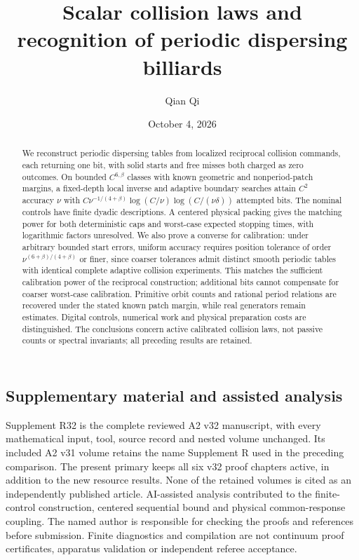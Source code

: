 \documentclass[11pt]{amsart}
\title[Scalar collision laws]{Scalar collision laws and recognition of periodic dispersing billiards}
\author{Qian Qi}
\date{October 4, 2026}
\theoremstyle{definition}\newtheorem{definition}[theorem]{Definition}
\theoremstyle{remark}\newtheorem{remark}[theorem]{Remark}
\numberwithin{equation}{section}
\begin{document}
\begin{abstract}
We reconstruct periodic dispersing tables from localized reciprocal
collision commands, each returning one bit, with solid starts and free
misses both charged as zero outcomes. On bounded $C^{6,\beta}$ classes
with known geometric and nonperiod-patch margins, a fixed-depth local
inverse and adaptive boundary searches attain $C^2$ accuracy $\nu$ with
$C\nu^{-1/(4+\beta)}\log(C/\nu)\log(C/(\nu\delta))$ attempted bits.
The nominal controls have finite dyadic descriptions. A centered physical
packing gives the matching power for both deterministic caps and
worst-case expected stopping times, with logarithmic factors unresolved.
We also prove a converse for calibration: under arbitrary bounded start
errors, uniform accuracy requires position tolerance of order
$\nu^{(6+\beta)/(4+\beta)}$ or finer, since coarser tolerances admit
distinct smooth periodic tables with identical complete adaptive
collision experiments. This matches the sufficient
calibration power of the reciprocal construction; additional bits
cannot compensate for coarser worst-case calibration. Primitive orbit
counts and rational period relations are recovered under the stated
known patch margin, while real generators remain estimates. Digital
controls, numerical work and physical preparation costs are distinguished.
The conclusions concern active calibrated collision laws, not passive
counts or spectral invariants; all preceding results are retained.
\end{abstract}
\maketitle










\clearpage
\subsection*{Supplementary material and assisted analysis}
Supplement R32 is the complete reviewed A2 v32 manuscript, with every
mathematical input, tool, source record and nested volume unchanged.
Its included A2 v31 volume retains the name Supplement R used in the
preceding comparison. The present primary keeps all six v32 proof
chapters active, in addition to the new resource results. None of the
retained volumes is cited as an independently published article.
AI-assisted analysis contributed to the finite-control construction,
centered sequential bound and physical common-response coupling. The
named author is responsible for checking the proofs and references
before submission. Finite diagnostics and compilation are not continuum
proof certificates, apparatus validation or independent referee acceptance.

\end{document}
